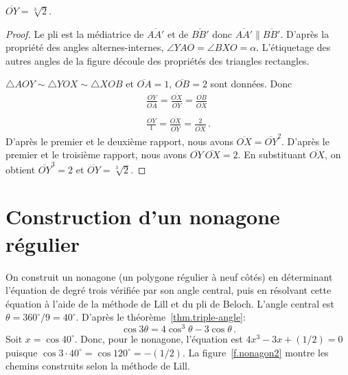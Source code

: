 \begin{theorem}
$\overline{OY}=\sqrt[3]{2}$.
\end{theorem}
\begin{proof}
Le pli est la médiatrice de $\overline{AA'}$ et de $\overline{BB'}$ donc $\overline{AA'}\parallel\overline{BB'}$. D'après la propriété des angles alternes-internes, $\angle YAO =\angle BXO=\alpha$. L'étiquetage des autres angles de la figure découle des propriétés des triangles rectangles.



$\triangle AOY\sim \triangle YOX \sim \triangle XOB$ et $\overline{OA}=1$, $\overline{OB}=2$ sont données. Donc
\[
\begin{array}{l}
\displaystyle\frac{\overline{OY}}{\overline{OA}}=\displaystyle\frac{\overline{OX}}{\overline{OY}}=\displaystyle\frac{\overline{OB}}{\overline{OX}}\\
\\
\displaystyle\frac{\overline{OY}}{1}=\displaystyle\frac{\overline{OX}}{\overline{OY}}=\displaystyle\frac{2}{\overline{OX}}\,.
\end{array}
\]
D'après le premier et le deuxième rapport, nous avons $\overline{OX}=\overline{OY}^2$. D'après le premier et le troisième rapport, nous avons $\overline{OY}\:\overline{OX}=2$.
En substituant $\overline{OX}$, on obtient $\overline{OY}^3=2$ et 
$\overline{OY}=\sqrt[3]{2}$.
\end{proof}



\section{Construction d'un nonagone régulier}\label{s.nonagon}



On construit un nonagone (un polygone régulier à neuf côtés) en déterminant l'équation de degré trois vérifiée par son angle central, puis en résolvant cette équation à l'aide de la méthode de Lill et du pli de Beloch. L'angle central est 
 $\theta=360^\circ/9=40^\circ$. D'après le théorème~\ref{thm.triple-angle}:
\[
\cos 3\theta=4\cos^3 \theta -3\cos\theta\,.
\]
Soit $x=\cos 40^{\circ}$. Donc, pour le nonagone, l'équation est $4x^3-3x+(1/2)=0$ puisque $\cos 3\cdot 40^\circ=\cos 120^\circ=-(1/2)$. La figure~\ref{f.nonagon2} montre les chemins construits  selon la méthode de Lill.

